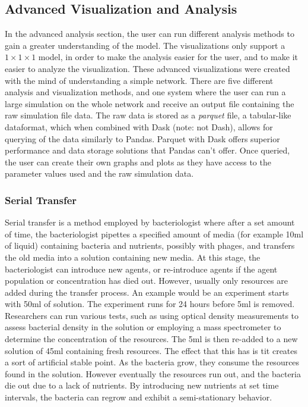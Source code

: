 \subsection{Advanced Visualization and Analysis}
In the advanced analysis section, the user can run different analysis methods to gain a greater understanding of the model. 
The visualizations only support a $1 \times 1\times 1$ model, in order to make the analysis easier for the user, and to make it easier to analyze the visualization. 
These advanced visualizations were created with the mind of understanding a simple network. 
There are five different analysis and visualization methods, and one system where the user can run a large simulation on the whole network and receive an output file containing the raw simulation file data. 
The raw data is stored as a \textit{parquet} file, a tabular-like dataformat, which when combined with Dask (note: not Dash), allows for querying of the data similarly to Pandas. 
Parquet with Dask offers superior performance and data storage solutions that Pandas can't offer. 
Once queried, the user can create their own graphs and plots as they have access to the parameter values used and the raw simulation data. 
\subsubsection{Serial Transfer}
Serial transfer is a method employed by bacteriologist where after a set amount of time, the bacteriologist pipettes a specified amount of media (for example 10ml of liquid) containing bacteria and  nutrients, possibly with phages, and transfers the old media into a solution containing new media. 
At this stage, the bacteriologist can introduce new agents, or re-introduce agents if the agent population or concentration has died out. 
However, usually only resources are added during the transfer process. 
An example would be an experiment starts with 50ml of solution. 
The experiment runs for 24 hours before 5ml is removed. 
Researchers can run various tests, such as using optical density measurements to assess bacterial density in the solution or employing a mass spectrometer to determine the concentration of the resources. 
The 5ml is then re-added to a new solution of 45ml containing fresh resources. 
The effect that this has is tit creates a sort of artificial stable point. 
As the bacteria grow, they consume the resources found in the solution. 
However eventually the resources run out, and the bacteria die out due to a lack of nutrients. 
By introducing new nutrients at set time intervals, the bacteria can regrow and exhibit a semi-stationary behavior. 
\newline 

